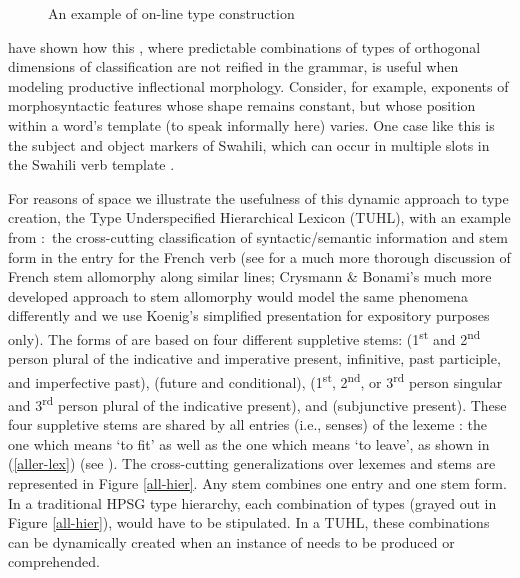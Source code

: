 \documentclass[output=paper
                ,modfonts
                ,nonflat
	        ,collection
	        ,collectionchapter
	        ,collectiontoclongg
 	        ,biblatex
                ,babelshorthands
                ,newtxmath
                ,draftmode
                ,colorlinks, citecolor=brown
]{./langsci/langscibook}
\begin{document}
{\begin{figure}
\caption{\label{fig-verb-hier2}An example of on-line type construction}
\end{figure}

\citet{CrysmannandBonami2016}  have shown how this ,  where predictable combinations of types of orthogonal dimensions of classification are not reified in the grammar, is useful when modeling productive inflectional morphology. Consider, for example, exponents of morphosyntactic features whose shape remains constant, but whose position within a word's template (to speak informally here) varies. One case like this is the subject and object markers of Swahili, which can occur in multiple slots in the Swahili verb template \citep{Stump1993b,BonamiandCrysmann2016}. 

For reasons of space we illustrate the usefulness of this dynamic approach to type creation, the Type Underspecified Hierarchical Lexicon (TUHL),  with an example from \citet{Koenig1999c}:\ the cross-cutting classification of syntactic/semantic information and stem form in the entry for the French verb  (see \citealt{BonamiandBoye2001} for a much more thorough discussion of French stem allomorphy along similar lines; Crysmann \& Bonami's much more developed approach to stem allomorphy would model the same phenomena differently and we use Koenig's simplified presentation for expository purposes only). The forms of  are based on four different suppletive stems:  (1\textsuperscript{st} and 2\textsuperscript{nd} person plural of the indicative and imperative present, infinitive, past participle, and imperfective past),  (future and conditional),  (1\textsuperscript{st}, 2\textsuperscript{nd}, or 3\textsuperscript{rd} person singular and 3\textsuperscript{rd} person plural of the indicative present), and  (subjunctive present). These four suppletive stems are shared by all entries (i.e., senses) of the lexeme : the one which means `to fit' as well as the one which means `to leave', as shown in (\ref{aller-lex}) (see \citealt[40--41]{Koenig1999c}). The cross-cutting generalizations over lexemes and stems are represented in Figure \ref{all-hier}. Any  stem combines one entry and one stem form. In a traditional HPSG type hierarchy, each combination of types (grayed out in Figure \ref{all-hier}), would have to be stipulated. In a TUHL, these combinations can be dynamically created when an instance of  needs to be produced or comprehended.

}
\end{document}
